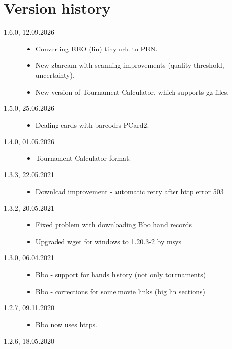 \documentclass[polish,a4paper,11pt,oneside]{article}
\begin{document}
\section{Version history}
\begin{description}
\item[1.6.0, 12.09.2026]
  \begin{itemize}
  \item Converting BBO (lin) tiny urls to PBN.
  \item New zbarcam with scanning improvements (quality threshold, uncertainty).
  \item New version of Tournament Calculator, which supports gz files.
  \end{itemize}
\item[1.5.0, 25.06.2026]
  \begin{itemize}
  \item Dealing cards with barcodes PCard2.
  \end{itemize}
\item[1.4.0, 01.05.2026]
  \begin{itemize}
  \item Tournament Calculator format.
  \end{itemize}
\item[1.3.3, 22.05.2021]
  \begin{itemize}
  \item Download improvement - automatic retry after http error 503
  \end{itemize}
\item[1.3.2, 20.05.2021]
  \begin{itemize}
  \item Fixed problem with downloading Bbo hand records
  \item Upgraded wget for windows to 1.20.3-2 by msys
  \end{itemize}
\item[1.3.0, 06.04.2021]
  \begin{itemize}
  \item Bbo - support for hands history (not only tournaments)
  \item Bbo - corrections for some movie links (big lin sections)
  \end{itemize}
\item[1.2.7, 09.11.2020]
  \begin{itemize}
  \item Bbo now uses https.
  \end{itemize}
\item[1.2.6, 18.05.2020]

\end{description}
\end{document}
